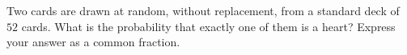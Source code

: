 Two cards are drawn at random, without replacement, from a standard deck of $52$ cards. What is the probability that exactly one of them is a heart? Express your answer as a common fraction.
